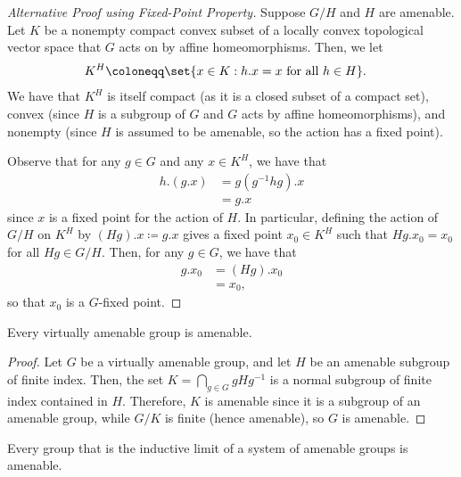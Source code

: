 \documentclass[10pt]{mypackage}
\renewcommand{\coloneq}{\coloneqq}
\begin{document}
\begin{proof}[Alternative Proof using Fixed-Point Property]
  Suppose $G/H$ and $H$ are amenable. Let $K$ be a nonempty compact convex subset of a locally convex topological vector space that $G$ acts on by affine homeomorphisms. Then, we let
  \begin{align*}
    K^H &\coloneq \set{x\in K : h.x = x\text{ for all }h\in H}.
  \end{align*}
  We have that $K^{H}$ is itself compact (as it is a closed subset of a compact set), convex (since $H$ is a subgroup of $G$ and $G$ acts by affine homeomorphisms), and nonempty (since $H$ is assumed to be amenable, so the action has a fixed point).

  Observe that for any $g\in G$ and any $x\in K^{H}$, we have that 
  \begin{align*}
    h.\left( g.x \right) &= g\left( g^{-1}hg \right).x\\
                        &= g.x
  \end{align*}
  since $x$ is a fixed point for the action of $H$. In particular, defining the action of $G/H$ on $K^{H}$ by $\left( Hg \right).x \coloneq g.x$ gives a fixed point $x_0\in K^{H}$ such that $Hg.x_0 = x_0$ for all $Hg\in G/H$. Then, for any $g\in G$, we have that
  \begin{align*}
    g.x_0 &= \left( Hg \right).x_0\\
          &= x_0,
  \end{align*}
  so that $x_0$ is a $G$-fixed point.
\end{proof}
\begin{corollary}
  Every virtually amenable group is amenable.
\end{corollary}
\begin{proof}
  Let $G$ be a virtually amenable group, and let $H$ be an amenable subgroup of finite index. Then, the set $K = \bigcap_{g\in G}gHg^{-1}$ is a normal subgroup of finite index contained in $H$. Therefore, $K$ is amenable since it is a subgroup of an amenable group, while $G/K$ is finite (hence amenable), so $G$ is amenable.
\end{proof}
\begin{proposition}
  Every group that is the inductive limit of a system of amenable groups is amenable.
\end{proposition}
\end{document}
